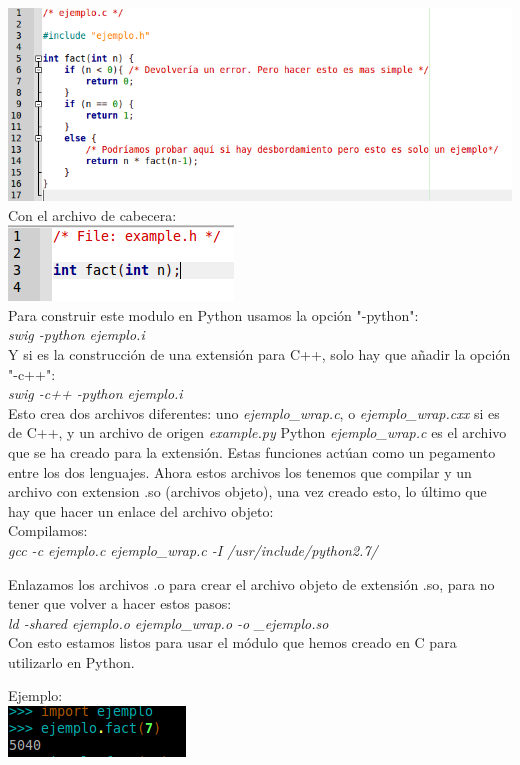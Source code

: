 \documentclass[a4paper,12pt]{article}
\begin{document}
\includegraphics[scale=0.5]{ejemploC.png}\\

Con el archivo de cabecera:\\


\includegraphics[scale=0.5]{ejemploH.png}\\

Para construir este modulo en Python usamos la opción "-python":\\

\textit{swig -python ejemplo.i}\\

Y si es la construcción de una extensión para C++, solo hay que añadir la opción "-c++":\\

\textit{swig -c++ -python ejemplo.i}\\


Esto crea dos archivos diferentes: uno \textit{ejemplo\_wrap.c}, o \textit{ejemplo\_wrap.cxx} si 
es de C++, y un archivo de origen \textit{example.py} Python
\textit{ejemplo\_wrap.c} es el archivo que se ha creado para la extensión. Estas funciones actúan como un pegamento entre los dos lenguajes. Ahora estos archivos los tenemos que compilar y un archivo con extension .so (archivos objeto), una vez creado esto, lo último que hay que hacer un enlace del archivo objeto:\\

Compilamos: \\

\textit{gcc -c ejemplo.c ejemplo\_wrap.c -I /usr/include/python2.7/}

Enlazamos los archivos .o para crear el archivo objeto de extensión .so, para no tener que volver a hacer estos pasos:\\

\textit{ld -shared ejemplo.o ejemplo\_wrap.o -o \_ejemplo.so}\\


Con esto estamos listos para usar el módulo que hemos creado en C para utilizarlo en Python.

Ejemplo:
\\

\includegraphics[scale=1]{ejemplo_fact.png}
\end{document}
